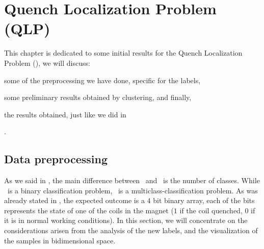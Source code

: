 \chapter{Quench Localization Problem (QLP)}
\label{chp:qlp}
This chapter is dedicated to some initial results for the Quench Localization Problem (\qlp), we will discuss:
\begin{inparaenum}[(i)]
	\item some of the preprocessing we have done, specific for the labels,
	\item some preliminary results obtained by clustering, and finally,
	\item the results obtained, just like we did in 
\end{inparaenum}.
\section{Data preprocessing}
\label{sec:qlp-preprocessing}
As we said in , the main difference between \qlp\ and \qrp\ is the number of
classes. While \qrp\ is a binary classification problem, \qlp\ is a multiclass-classification
problem. As was already stated in , the expected outcome is a $4$ bit binary array, each of the bits represents the state of one of the coils in the magnet ($1$ if the coil quenched, $0$ if it is in normal working conditions). In this section, we will concentrate on the considerations arisen from the analysis of the new labels, and the visualization of the samples in bidimensional space.

